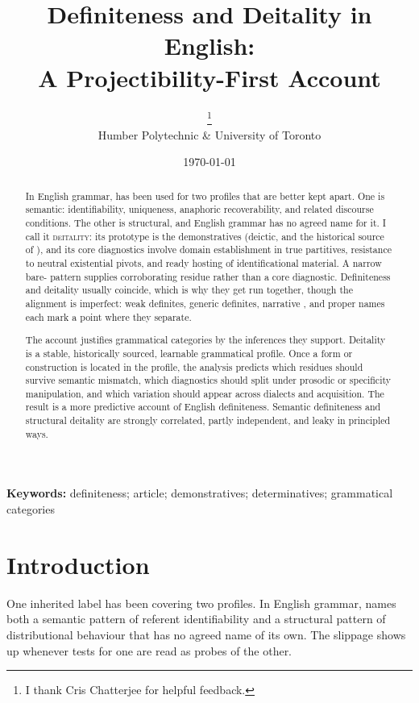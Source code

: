 \documentclass[12pt,letterpaper]{article}
\title{Definiteness and Deitality in English:\\A Projectibility-First Account}
\author{}
\date{}
\author{\AuthorWithORCID{Brett Reynolds}{\myorcid}\thanks{I thank Cris Chatterjee for helpful feedback.}\\[4pt]
Humber Polytechnic \& University of Toronto}
\date{\today}
\newcommand{\Deitality}{\textsc{deitality}}
\begin{document}
\maketitle

\begin{abstract}
In English grammar,  has been used for two profiles that are better kept apart. One is semantic: identifiability, uniqueness, anaphoric recoverability, and related discourse conditions. The other is structural, and English grammar has no agreed name for it. I call it \Deitality{}: its prototype is the demonstratives (deictic, and the historical source of ), and its core diagnostics involve domain establishment in true partitives, resistance to neutral existential  pivots, and ready hosting of identificational material. A narrow bare- pattern supplies corroborating residue rather than a core diagnostic. Definiteness and deitality usually coincide, which is why they get run together, though the alignment is imperfect: weak definites, generic definites, narrative , and proper names each mark a point where they separate.

The account justifies grammatical categories by the inferences they support. Deitality is a stable, historically sourced, learnable grammatical profile. Once a form or construction is located in the profile, the analysis predicts which residues should survive semantic mismatch, which diagnostics should split under prosodic or specificity manipulation, and which variation should appear across dialects and acquisition. The result is a more predictive account of English definiteness. Semantic definiteness and structural deitality are strongly correlated, partly independent, and leaky in principled ways.
\end{abstract}

\noindent\textbf{Keywords:} definiteness; article; demonstratives; determinatives; grammatical categories

\newpage
\section{Introduction}\label{sec:intro}

One inherited label has been covering two profiles. In English grammar,  names both a semantic pattern of referent identifiability and a structural pattern of distributional behaviour that has no agreed name of its own. The slippage shows up whenever tests for one are read as probes of the other.
\end{document}
